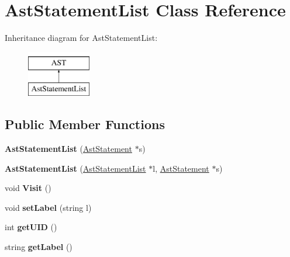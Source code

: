 \hypertarget{classAstStatementList}{\section{Ast\-Statement\-List Class Reference}
\label{classAstStatementList}
}
Inheritance diagram for Ast\-Statement\-List\-:\begin{figure}[H]
\begin{center}
\leavevmode
\includegraphics[height=2.000000cm]{classAstStatementList}
\end{center}
\end{figure}
\subsection*{Public Member Functions}
\begin{DoxyCompactItemize}
\item 
\hypertarget{classAstStatementList_a4ac59b2b83022bdbdc5185b0c03688cd}{{\bfseries Ast\-Statement\-List} (\hyperlink{classAstStatement}{Ast\-Statement} $\ast$s)}\label{classAstStatementList_a4ac59b2b83022bdbdc5185b0c03688cd}

\item 
\hypertarget{classAstStatementList_abbf3a704a21fbecef5f4ce1be24449b3}{{\bfseries Ast\-Statement\-List} (\hyperlink{classAstStatementList}{Ast\-Statement\-List} $\ast$l, \hyperlink{classAstStatement}{Ast\-Statement} $\ast$s)}\label{classAstStatementList_abbf3a704a21fbecef5f4ce1be24449b3}

\item 
\hypertarget{classAstStatementList_a3390e533f15c418a597e1eb3b2a14b99}{void {\bfseries Visit} ()}\label{classAstStatementList_a3390e533f15c418a597e1eb3b2a14b99}

\item 
\hypertarget{classAST_a71d680856e95ff89f55d5311a552eba6}{void {\bfseries set\-Label} (string l)}\label{classAST_a71d680856e95ff89f55d5311a552eba6}

\item 
\hypertarget{classAST_ab7a5b1d9f1c2de0d98deb356f724a42c}{int {\bfseries get\-U\-I\-D} ()}\label{classAST_ab7a5b1d9f1c2de0d98deb356f724a42c}

\item 
\hypertarget{classAST_aee029be902fffc927d16ccb03eb922ad}{string {\bfseries get\-Label} ()}\label{classAST_aee029be902fffc927d16ccb03eb922ad}

\end{DoxyCompactItemize}
